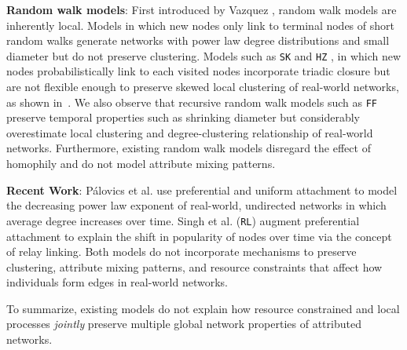 \textbf{Random walk models}:
First introduced by Vazquez \cite{vazquez2000knowing}, random walk models are inherently local.
Models \cite{blum2006random} in which
new nodes only link to terminal nodes of short random walks generate
networks with power law degree distributions \cite{chebolu2008pagerank} and
small diameter \cite{mehrabian2016sa} but do not preserve clustering. Models
such as \texttt{SK} \cite{saramaki2004scale}
and \texttt{HZ} \cite{herrera2011generating}, in which new nodes probabilistically link to
each visited nodes incorporate triadic closure but are not flexible enough to preserve
{skewed} local clustering of real-world networks, as shown in~.
We also observe that recursive random walk models such as \texttt{FF} \cite{leskovec2005graphs}
preserve temporal properties such as shrinking diameter but considerably overestimate local clustering
and degree-clustering relationship of real-world networks.
Furthermore, existing random walk models disregard the effect of homophily and do not model attribute mixing
patterns.

\textbf{Recent Work}:
P{\'a}lovics et al. \cite{palovics2017raising} use preferential and uniform
attachment to model the decreasing power law exponent of real-world, undirected
networks in which average degree increases over time. Singh et al.
\cite{singh2017relay} (\texttt{RL}) augment preferential attachment to explain
the shift in popularity of nodes over time via the concept of relay linking.
Both models do not incorporate mechanisms to preserve clustering, attribute
mixing patterns, and resource constraints that affect how individuals form edges
in real-world networks.

To summarize, existing models do not explain how resource constrained and local processes
\textit{jointly} preserve multiple global network properties of attributed networks.



